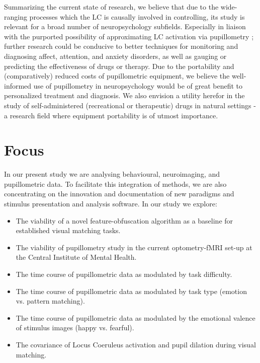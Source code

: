 	Summarizing the current state of research, we believe that due to the wide-ranging processes which the LC is causally involved in controlling, its study is relevant for a broad number of neuropsychology subfields.
	Especially in liaison with the purported possibility of approximating LC activation via pupillometry \citep{Gilzenrat2010,Murphy2011}; further research could be conducive to better techniques for monitoring and diagnosing affect, attention, and anxiety disorders, as well as gauging or predicting the effectiveness of drugs or therapy.
	Due to the portability \citep{Bradley2010} and (comparatively) reduced costs of pupillometric equipment, we believe the well-informed use of pupillometry in neuropsychology would be of great benefit to personalized treatment and diagnosis.
	We also envision a utility herefor in the study of self-administered (recreational or therapeutic) drugs in natural settings - a research field where equipment portability is of utmost importance.
    \section{Focus}\label{sec:b_f}
	In our present study we are analysing behavioural, neuroimaging, and pupillometric data.
	To facilitate this integration of methods, we are also concentrating on the innovation and documentation of new paradigms and stimulus presentation and analysis software.
	In our study we explore:
	\begin{itemize}
	    \item The viability of a novel feature-obfuscation algorithm as a baseline for established visual matching tasks.
	    \item The viability of pupillometry study in the current optometry-fMRI set-up at the Central Institute of Mental Health.
	    \item The time course of pupillometric data as modulated by task difficulty.
	    \item The time course of pupillometric data as modulated by task type (emotion vs. pattern matching).
	    \item The time course of pupillometric data as modulated by the emotional valence of stimulus images (happy vs. fearful).
	    \item The covariance of Locus Coeruleus activation and pupil dilation during visual matching.
	\end{itemize}
	
